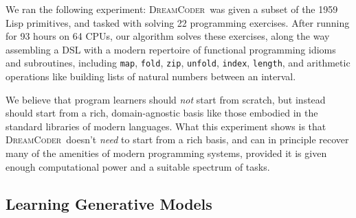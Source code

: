 \documentclass{article}
\newcommand{\system}{\textsc{DreamCoder}~}
\newcommand{\code}[1]{{\footnotesize\texttt{#1}}}
\begin{document}
We ran the following experiment: \system was given a subset of
the 1959 Lisp primitives, and tasked with solving 22
programming exercises.  After running for 93 hours on 64 CPUs, our
algorithm solves these exercises, along the way assembling a DSL
with a modern repertoire of
functional programming idioms and subroutines, including \code{map},
\code{fold}, \code{zip}, \code{unfold}, \code{index}, \code{length},
and  arithmetic operations like 
building lists of natural numbers between an interval.

We believe that program learners should \emph{not}
start from scratch,
but instead should start from
a rich, domain-agnostic
basis like those embodied in the standard libraries of modern  languages.
What this experiment shows is that \system doesn't \emph{need} to start from a rich basis,
and can in principle recover many of the amenities of modern programming systems,
provided it is given enough computational power and a suitable
spectrum of tasks.%

\subsection{Learning Generative Models}
\end{document}
